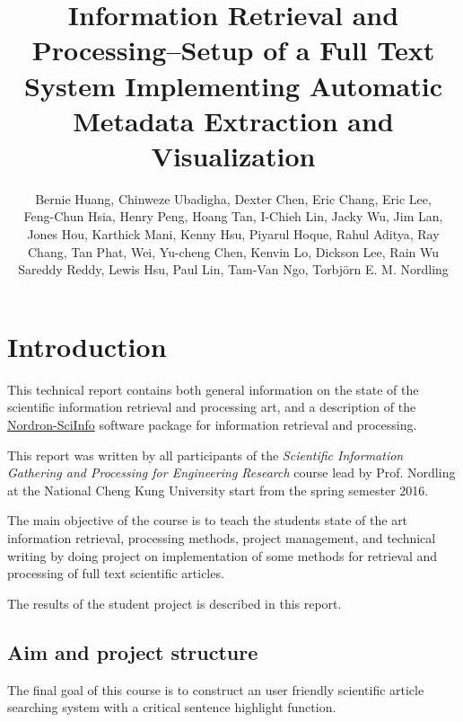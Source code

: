 \documentclass[a4paper,twocolumn,twoside]{article}
\begin{document}
 
	
	\title{Information Retrieval and Processing--Setup of a Full Text System Implementing Automatic Metadata Extraction and Visualization}
	\author{Bernie Huang, Chinweze Ubadigha, Dexter Chen, Eric Chang, Eric Lee, \\
		Feng-Chun Hsia, Henry Peng, Hoang Tan, I-Chieh Lin, Jacky Wu, Jim Lan, \\
		Jones Hou, Karthick Mani, Kenny Hsu, Piyarul Hoque, Rahul Aditya, Ray \\
		Chang, Tan Phat, Wei, Yu-cheng Chen, Kenvin Lo, Dickson Lee, Rain Wu\\
		 Sareddy Reddy, Lewis Hsu, Paul Lin, Tam-Van Ngo, Torbj\"{o}rn E. M. Nordling}  %
	\maketitle   
	
	\section{Introduction}
	\label{Introduction}
	
	This technical report contains both general information on the state of the scientific information retrieval and processing art, and a description of the \href{https://bitbucket.org/nordron/nordron-sciinfo}{Nordron-SciInfo} software package for information retrieval and processing. 
	
	This report was written by all participants of the \emph{Scientific Information Gathering and Processing for Engineering Research} course lead by Prof. Nordling at the National Cheng Kung University start from the spring semester 2016.
	
	The main objective of the course is to teach the students state of the art information retrieval, processing methods, project management, and technical writing by doing project on implementation of some methods for retrieval and processing of full text scientific articles.
	
	The results of the student project is described in this report.
	
	\subsection{Aim and project structure}
	\label{aim}
	
	The final goal of this course is to construct an user friendly scientific article searching system with a critical sentence highlight function.
	
\end{document}
